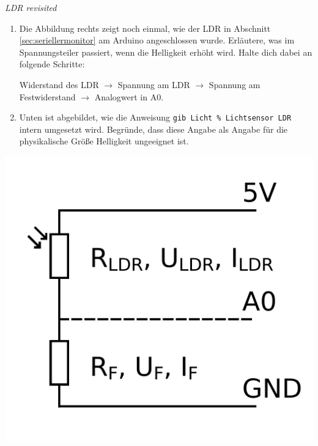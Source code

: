 \medskip
\begin{minipage}{0.73\textwidth}
	\begin{aufgabe} \emph{LDR revisited}
		\begin{enumerate}[label=\alph*), itemsep=0ex, parsep=0ex]
			\item Die Abbildung rechts zeigt noch einmal, wie der LDR in Abschnitt \ref{sec:seriellermonitor} am Arduino angeschlossen wurde. Erläutere, was im Spannungsteiler passiert, wenn die Helligkeit erhöht wird. Halte dich dabei an folgende Schritte:
			
			Widerstand des LDR $\rightarrow$ Spannung am LDR $\rightarrow$ Spannung am Festwiderstand $\rightarrow$ Analogwert in A0.
			\item Unten ist abgebildet, wie die Anweisung \texttt{gib Licht \% Lichtsensor LDR} intern umgesetzt wird. Begründe, dass diese Angabe als Angabe für die physikalische Größe Helligkeit ungeeignet ist.
		\end{enumerate}
	\end{aufgabe}
\end{minipage}
\hfill
\begin{minipage}{0.25\textwidth}
	\centering
	\includegraphics[width=\textwidth]{./Zeichnungen/spannungsteiler-ldr-beschriftet-2.png}
\end{minipage}

